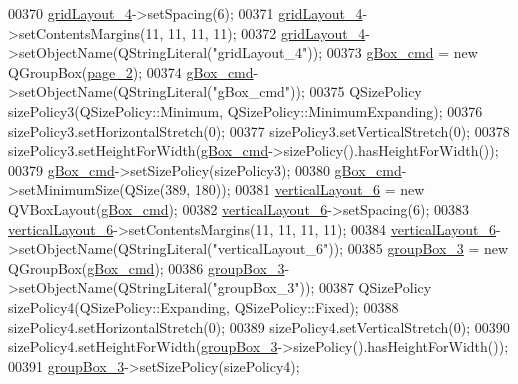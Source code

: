 \begin{DoxyCode}
00370         \hyperlink{a00080_a8ee86315639f324b17708efc7dbe8b19}{gridLayout\_4}->setSpacing(6);
00371         \hyperlink{a00080_a8ee86315639f324b17708efc7dbe8b19}{gridLayout\_4}->setContentsMargins(11, 11, 11, 11);
00372         \hyperlink{a00080_a8ee86315639f324b17708efc7dbe8b19}{gridLayout\_4}->setObjectName(QStringLiteral(\textcolor{stringliteral}{"gridLayout\_4"}));
00373         \hyperlink{a00080_ad5c6667239e28060ba3b04ee0db97bac}{gBox\_cmd} = \textcolor{keyword}{new} QGroupBox(\hyperlink{a00080_adcb6de4cebc6760fe319711f125010cc}{page\_2});
00374         \hyperlink{a00080_ad5c6667239e28060ba3b04ee0db97bac}{gBox\_cmd}->setObjectName(QStringLiteral(\textcolor{stringliteral}{"gBox\_cmd"}));
00375         QSizePolicy sizePolicy3(QSizePolicy::Minimum, QSizePolicy::MinimumExpanding);
00376         sizePolicy3.setHorizontalStretch(0);
00377         sizePolicy3.setVerticalStretch(0);
00378         sizePolicy3.setHeightForWidth(\hyperlink{a00080_ad5c6667239e28060ba3b04ee0db97bac}{gBox\_cmd}->sizePolicy().hasHeightForWidth());
00379         \hyperlink{a00080_ad5c6667239e28060ba3b04ee0db97bac}{gBox\_cmd}->setSizePolicy(sizePolicy3);
00380         \hyperlink{a00080_ad5c6667239e28060ba3b04ee0db97bac}{gBox\_cmd}->setMinimumSize(QSize(389, 180));
00381         \hyperlink{a00080_a93c190b085c63a667c535ba0bbcfec7c}{verticalLayout\_6} = \textcolor{keyword}{new} QVBoxLayout(\hyperlink{a00080_ad5c6667239e28060ba3b04ee0db97bac}{gBox\_cmd});
00382         \hyperlink{a00080_a93c190b085c63a667c535ba0bbcfec7c}{verticalLayout\_6}->setSpacing(6);
00383         \hyperlink{a00080_a93c190b085c63a667c535ba0bbcfec7c}{verticalLayout\_6}->setContentsMargins(11, 11, 11, 11);
00384         \hyperlink{a00080_a93c190b085c63a667c535ba0bbcfec7c}{verticalLayout\_6}->setObjectName(QStringLiteral(\textcolor{stringliteral}{"verticalLayout\_6"}));
00385         \hyperlink{a00080_a320d3d7ba1cb8fff7b7b95923ed10f5e}{groupBox\_3} = \textcolor{keyword}{new} QGroupBox(\hyperlink{a00080_ad5c6667239e28060ba3b04ee0db97bac}{gBox\_cmd});
00386         \hyperlink{a00080_a320d3d7ba1cb8fff7b7b95923ed10f5e}{groupBox\_3}->setObjectName(QStringLiteral(\textcolor{stringliteral}{"groupBox\_3"}));
00387         QSizePolicy sizePolicy4(QSizePolicy::Expanding, QSizePolicy::Fixed);
00388         sizePolicy4.setHorizontalStretch(0);
00389         sizePolicy4.setVerticalStretch(0);
00390         sizePolicy4.setHeightForWidth(\hyperlink{a00080_a320d3d7ba1cb8fff7b7b95923ed10f5e}{groupBox\_3}->sizePolicy().hasHeightForWidth());
00391         \hyperlink{a00080_a320d3d7ba1cb8fff7b7b95923ed10f5e}{groupBox\_3}->setSizePolicy(sizePolicy4);

\end{DoxyCode}
